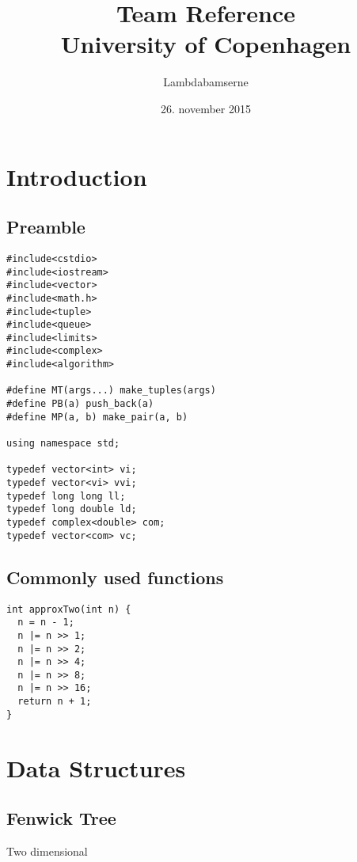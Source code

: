 \documentclass[a4paper,11pt]{article}
\title{Team Reference\\
       University of Copenhagen}
\author{Lambdabamserne}
\date{26. november 2015}
\begin{document}
\maketitle
\thispagestyle{fancy}
\tableofcontents

\section{Introduction}
  \subsection{Preamble}
\begin{lstlisting}
#include<cstdio>
#include<iostream>
#include<vector>
#include<math.h>
#include<tuple>
#include<queue>
#include<limits>
#include<complex>
#include<algorithm>

#define MT(args...) make_tuples(args)
#define PB(a) push_back(a)
#define MP(a, b) make_pair(a, b)

using namespace std;

typedef vector<int> vi;
typedef vector<vi> vvi;
typedef long long ll;
typedef long double ld;
typedef complex<double> com;
typedef vector<com> vc;
\end{lstlisting}
  
  \subsection{Commonly used functions}
\begin{lstlisting}
int approxTwo(int n) {
  n = n - 1;
  n |= n >> 1;
  n |= n >> 2;
  n |= n >> 4;
  n |= n >> 8;
  n |= n >> 16;
  return n + 1;
}
\end{lstlisting}

\section{Data Structures}
  \subsection{Fenwick Tree}
    
    Two dimensional
    
  
    
\end{document}
